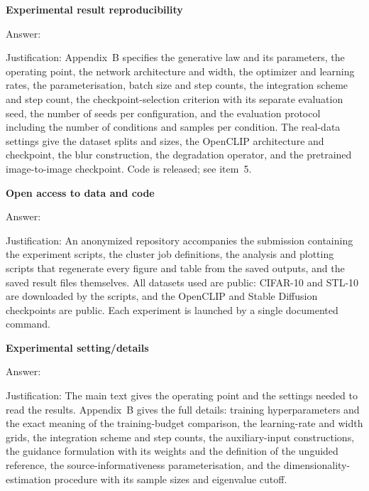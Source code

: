 \item {\bf Experimental result reproducibility}
    \item[] Answer: \answerYes{}
    \item[] Justification: Appendix~B specifies the generative law and its parameters, the
    operating point, the network architecture and width, the optimizer and learning rates, the
    parameterisation, batch size and step counts, the integration scheme and step count, the
    checkpoint-selection criterion with its separate evaluation seed, the number of seeds per
    configuration, and the evaluation protocol including the number of conditions and samples per
    condition. The real-data settings give the dataset splits and sizes, the OpenCLIP
    architecture and checkpoint, the blur construction, the degradation operator, and the
    pretrained image-to-image checkpoint. Code is released; see item~5.

\item {\bf Open access to data and code}
    \item[] Answer: \answerYes{}
    \item[] Justification: An anonymized repository accompanies the submission containing the
    experiment scripts, the cluster job definitions, the analysis and plotting scripts that
    regenerate every figure and table from the saved outputs, and the saved result files
    themselves. All datasets used are public: CIFAR-10 and STL-10 are downloaded by the scripts,
    and the OpenCLIP and Stable Diffusion checkpoints are public. Each experiment is launched by
    a single documented command.

\item {\bf Experimental setting/details}
    \item[] Answer: \answerYes{}
    \item[] Justification: The main text gives the operating point and the settings needed to
    read the results. Appendix~B gives the full details: training hyperparameters and the exact
    meaning of the training-budget comparison, the learning-rate and width grids, the integration
    scheme and step counts, the auxiliary-input constructions, the guidance formulation with its
    weights and the definition of the unguided reference, the source-informativeness
    parameterisation, and the dimensionality-estimation procedure with its sample sizes and
    eigenvalue cutoff.

